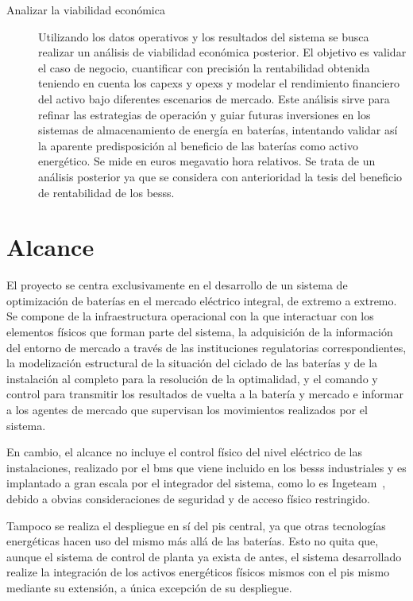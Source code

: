 \begin{description}
  \item[Analizar la viabilidad económica] Utilizando los datos operativos y los resultados del sistema se busca realizar un análisis de viabilidad económica posterior. El objetivo es validar el caso de negocio, cuantificar con precisión la rentabilidad obtenida teniendo en cuenta los \glspl{capex} y \glspl{opex} y modelar el rendimiento financiero del activo bajo diferentes escenarios de mercado. Este análisis sirve para refinar las estrategias de operación y guiar futuras inversiones en los sistemas de almacenamiento de energía en baterías, intentando validar así la aparente predisposición al beneficio de las baterías como activo energético. Se mide en euros megavatio hora relativos. Se trata de un análisis posterior ya que se considera con anterioridad la tesis del beneficio de rentabilidad de los \glspl{bess}.

\end{description}

\section{Alcance}
\label{makereference1.2}

El proyecto se centra exclusivamente en el desarrollo de un sistema de optimización de baterías en el mercado eléctrico integral, de extremo a extremo. Se compone de la infraestructura operacional con la que interactuar con los elementos físicos que forman parte del sistema, la adquisición de la información del entorno de mercado a través de las instituciones regulatorias correspondientes, la modelización estructural de la situación del ciclado de las baterías y de la instalación al completo para la resolución de la optimalidad, y el comando y control para transmitir los resultados de vuelta a la batería y mercado e informar a los agentes de mercado que supervisan los movimientos realizados por el sistema.

En cambio, el alcance no incluye el control físico del nivel eléctrico de las instalaciones, realizado por el \gls{bms} que viene incluido en los \glspl{bess} industriales y es implantado a gran escala por el integrador del sistema, como lo es Ingeteam~\cite{ingeteam2022ingeteam}, debido a obvias consideraciones de seguridad y de acceso físico restringido.

Tampoco se realiza el despliegue en sí del \gls{pis} central, ya que otras tecnologías energéticas hacen uso del mismo más allá de las baterías. Esto no quita que, aunque el sistema de control de planta ya exista de antes, el sistema desarrollado realize la integración de los activos energéticos físicos mismos con el \gls{pis} mismo mediante su extensión, a única excepción de su despliegue.

